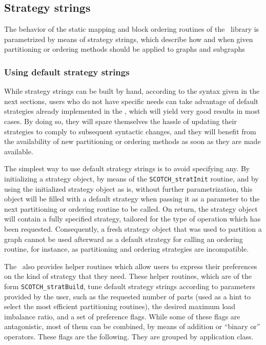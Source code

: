\subsection{Strategy strings}

The behavior of the static mapping and block ordering routines of the
\libscotch\ library is parametrized by means of strategy strings,
which describe how and when given partitioning or ordering methods
should be applied to graphs and subgraphs

\subsubsection{Using default strategy strings}
\label{sec-lib-format-strat-default}

While strategy strings can be built by hand, according to the syntax
given in the next sections, users who do not have specific needs can
take advantage of default strategies already implemented in the
\libscotch, which will yield very good results in most cases. By
doing so, they will spare themselves the hassle of updating their
strategies to comply to subsequent syntactic changes, and they will
benefit from the availability of new partitioning or ordering methods
as soon as they are made available.

The simplest way to use default strategy strings is to avoid
specifying any. By initializing a strategy object, by means of the
{\tt SCOTCH\_\lbt stratInit} routine, and by using the initialized
strategy object as is, without further parametrization, this object
will be filled with a default strategy when passing it as a parameter
to the next partitioning or ordering routine to be called. On return,
the strategy object will contain a fully specified strategy, tailored
for the type of operation which has been requested. Consequently, a
fresh strategy object that was used to partition a graph cannot be
used afterward as a default strategy for calling an ordering routine,
for instance, as partitioning and ordering strategies are incompatible.

The \libscotch\ also provides helper routines which allow users to
express their preferences on the kind of strategy that they
need. These helper routines, which are of the form
{\tt SCOTCH\_\lbt strat\lbt *\lbt Build}, tune default strategy strings
according to parameters provided by the user, such as the requested
number of parts (used as a hint to select the most efficient
partitioning routines), the desired maximum load imbalance ratio,
and a set of preference flags. While some of these flags are
antagonistic, most of them can be combined, by means of addition or
``binary or'' operators. These flags are the following.
They are grouped by application class.

